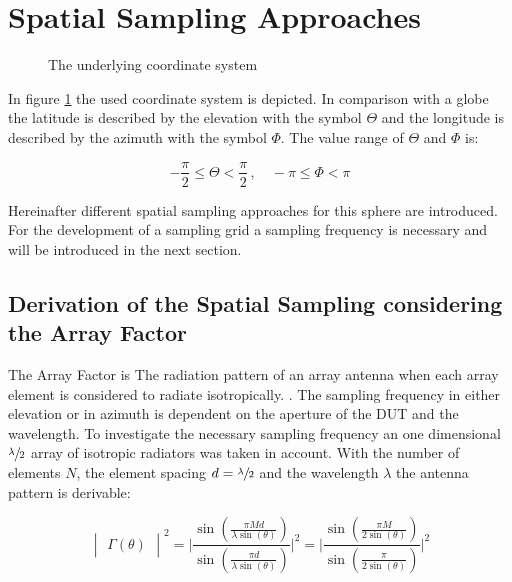 \section{Spatial Sampling Approaches}

\begin{figure}[h]
\centering
\def\svgwidth{0.4\textwidth}

\caption{The underlying coordinate system}
\label{coordinates}
\end{figure}

In figure \ref{coordinates} the used coordinate system is depicted. In comparison with a globe the latitude is described by the elevation with the symbol $\Theta$ and the longitude is described by the azimuth with the symbol $\Phi$. The value range of $\Theta$ and $\Phi$ is:

\begin{equation}
-\frac{\pi}{2} \leq \Theta <\frac{\pi}{2}\, ,\quad -\pi \leq \Phi < \pi
\end{equation}

Hereinafter different spatial sampling approaches for this sphere are introduced. For the development of a sampling grid a sampling frequency is necessary and will be introduced in the next section.

\subsection{Derivation of the Spatial Sampling considering the Array Factor}
\label{sec:spasa}

The Array Factor is \glqq The radiation pattern of an array antenna when each array element is considered to radiate isotropically.\grqq{} \cite{ieeeantenna}. The sampling frequency in either elevation or in azimuth is dependent on the aperture of the \ac{DUT} and the wavelength. To investigate the necessary sampling frequency an one dimensional $\sfrac{\lambda}{2}$ array of isotropic radiators was taken in account. With the number of elements $N$, the element spacing $d = \sfrac{\lambda}{2}$ and the wavelength $\lambda$ the antenna pattern is derivable: \cite{litze}

\begin{equation}
\begin{vmatrix}\Gamma\left(\theta\right)\end{vmatrix}^2 = \Biggl|\frac{\sin\left(\frac{\pi M d}{\lambda \sin\left(\theta\right)}\right)}{\sin\left(\frac{\pi d}{\lambda \sin\left(\theta\right)}\right)}\Biggl|^2 = \Biggl|\frac{\sin\left(\frac{\pi M}{2 \sin\left(\theta\right)}\right)}{\sin\left(\frac{\pi}{2 \sin\left(\theta\right)}\right)}\Biggl|^2
\end{equation}

